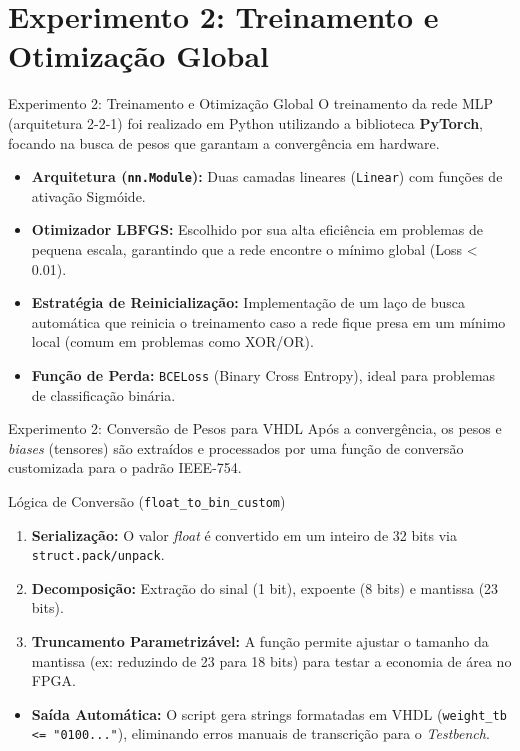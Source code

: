 \documentclass[aspectratio=169]{beamer}
\begin{document}
\section{Experimento 2: Treinamento e Otimização Global}




\begin{frame}{Experimento 2: Treinamento e Otimização Global}
	\justifying
	O treinamento da rede MLP (arquitetura 2-2-1) foi realizado em Python utilizando a biblioteca \textbf{PyTorch}, focando na busca de pesos que garantam a convergência em hardware.
	
	\begin{itemize}
		\item \textbf{Arquitetura (\texttt{nn.Module}):} Duas camadas lineares (\texttt{Linear}) com funções de ativação Sigmóide.
		\item \textbf{Otimizador LBFGS:} Escolhido por sua alta eficiência em problemas de pequena escala, garantindo que a rede encontre o mínimo global (Loss < 0.01).
		\item \textbf{Estratégia de Reinicialização:} Implementação de um laço de busca automática que reinicia o treinamento caso a rede fique presa em um mínimo local (comum em problemas como XOR/OR).
		\item \textbf{Função de Perda:} \texttt{BCELoss} (Binary Cross Entropy), ideal para problemas de classificação binária.
	\end{itemize}
\end{frame}

\begin{frame}{Experimento 2: Conversão de Pesos para VHDL}
	\justifying
	Após a convergência, os pesos e \textit{biases} (tensores) são extraídos e processados por uma função de conversão customizada para o padrão IEEE-754.
	
	\begin{block}{Lógica de Conversão (\texttt{float\_to\_bin\_custom})}
		\begin{enumerate}
			\item \textbf{Serialização:} O valor \textit{float} é convertido em um inteiro de 32 bits via \texttt{struct.pack/unpack}.
			\item \textbf{Decomposição:} Extração do sinal (1 bit), expoente (8 bits) e mantissa (23 bits).
			\item \textbf{Truncamento Parametrizável:} A função permite ajustar o tamanho da mantissa (ex: reduzindo de 23 para 18 bits) para testar a economia de área no FPGA.
		\end{enumerate}
	\end{block}
	
	\begin{itemize}
		\item \textbf{Saída Automática:} O script gera strings formatadas em VHDL (\texttt{weight\_tb <= "0100..."}), eliminando erros manuais de transcrição para o \textit{Testbench}.
	\end{itemize}
\end{frame}
\end{document}
